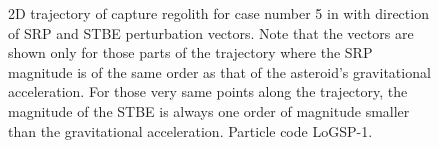 \begin{figure}[htb]
\centering
\captionsetup{justification=centering}
\caption{2D trajectory of capture regolith for case number 5 in  with direction of \gls{SRP} and \gls{STBE} perturbation vectors. Note that the vectors are shown only for those parts of the trajectory where the \gls{SRP} magnitude is of the same order as that of the asteroid's gravitational acceleration. For those very same points along the trajectory, the magnitude of the \gls{STBE} is always one order of magnitude smaller than the gravitational acceleration. Particle code LoGSP-1.}
\label{fig:LoGSP_1_capture_case_5_2d_trajectory_srp_stbe_perturbationVectors}
\end{figure}
\FloatBarrier
